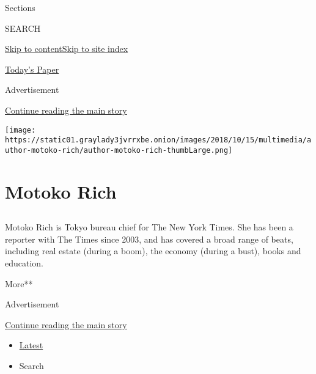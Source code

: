 Sections

SEARCH

\protect\hyperlink{site-content}{Skip to
content}\protect\hyperlink{site-index}{Skip to site index}

\href{https://myaccount.nytimes3xbfgragh.onion/auth/login?response_type=cookie\&client_id=vi}{}

\href{https://www.nytimes3xbfgragh.onion/section/todayspaper}{Today's
Paper}

Advertisement

\protect\hyperlink{after-top}{Continue reading the main story}

\texttt{[image: https://static01.graylady3jvrrxbe.onion/images/2018/10/15/multimedia/author-motoko-rich/author-motoko-rich-thumbLarge.png]}

\hypertarget{motoko-rich}{%
\section{Motoko Rich}\label{motoko-rich}}

\subsection{}

Motoko Rich is Tokyo bureau chief for The New York Times. She has been a
reporter with The Times since 2003, and has covered a broad range of
beats, including real estate (during a boom), the economy (during a
bust), books and education.

More**

Advertisement

\protect\hyperlink{after-mid1}{Continue reading the main story}

\begin{itemize}
\tightlist
\item
  \protect\hyperlink{stream-panel}{Latest}
\item
  Search
\end{itemize}

